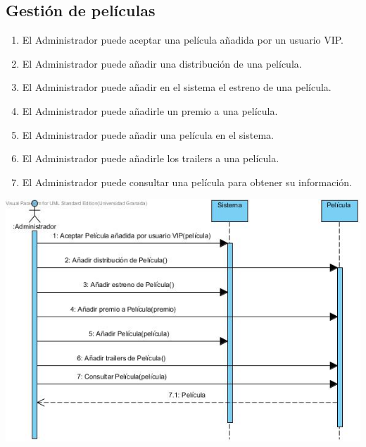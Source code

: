 \documentclass{article}
\begin{document}
	\subsection*{Gestión de películas}
		\begin{enumerate}
   	 		\item El Administrador puede aceptar una película añadida por un usuario VIP.
   		    \item El Administrador puede añadir una distribución de una película.
        		\item El Administrador puede añadir en el sistema el estreno de una película.
        		\item El Administrador puede añadirle un premio a una película.
        		\item El Administrador puede añadir una película en el sistema.
        		\item El Administrador puede añadirle los trailers a una película.
        		\item El Administrador puede consultar una película para obtener su información.
    		\end{enumerate}
    		\includegraphics[width=1\linewidth]{./S-peliculas}
\end{document}
